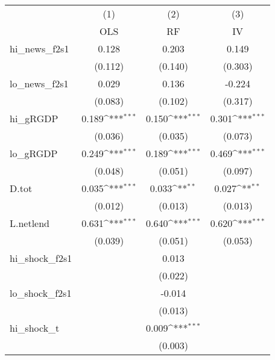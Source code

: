 {
\def\sym#1{\ifmmode^{#1}\else\(^{#1}\)\fi}
\begin{tabular}{l*{3}{c}}
\toprule
            &\multicolumn{1}{c}{(1)}&\multicolumn{1}{c}{(2)}&\multicolumn{1}{c}{(3)}\\
            &\multicolumn{1}{c}{OLS}&\multicolumn{1}{c}{RF}&\multicolumn{1}{c}{IV}\\
\midrule
hi\_news\_f2s1&       0.128         &       0.203         &       0.149         \\
            &     (0.112)         &     (0.140)         &     (0.303)         \\
\addlinespace
lo\_news\_f2s1&       0.029         &       0.136         &      -0.224         \\
            &     (0.083)         &     (0.102)         &     (0.317)         \\
\addlinespace
hi\_gRGDP    &       0.189\sym{***}&       0.150\sym{***}&       0.301\sym{***}\\
            &     (0.036)         &     (0.035)         &     (0.073)         \\
\addlinespace
lo\_gRGDP    &       0.249\sym{***}&       0.189\sym{***}&       0.469\sym{***}\\
            &     (0.048)         &     (0.051)         &     (0.097)         \\
\addlinespace
D.tot       &       0.035\sym{***}&       0.033\sym{**} &       0.027\sym{**} \\
            &     (0.012)         &     (0.013)         &     (0.013)         \\
\addlinespace
L.netlend   &       0.631\sym{***}&       0.640\sym{***}&       0.620\sym{***}\\
            &     (0.039)         &     (0.051)         &     (0.053)         \\
\addlinespace
hi\_shock\_f2s1&                     &       0.013         &                     \\
            &                     &     (0.022)         &                     \\
\addlinespace
lo\_shock\_f2s1&                     &      -0.014         &                     \\
            &                     &     (0.013)         &                     \\
\addlinespace
hi\_shock\_t  &                     &       0.009\sym{***}&                     \\
            &                     &     (0.003)         &                     \\

\end{tabular}}
